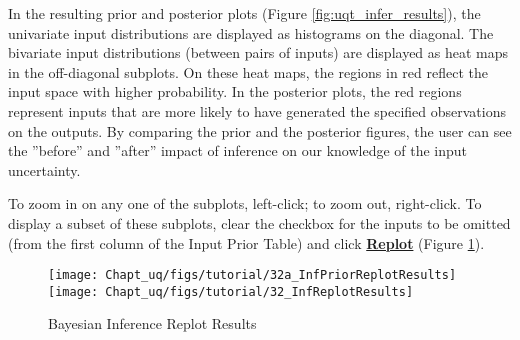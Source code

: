 In the resulting prior and posterior plots 
(Figure \ref{fig:uqt_infer_results}), the univariate
input distributions are displayed as histograms on the
diagonal. The bivariate input distributions (between pairs of inputs)
are displayed as heat maps in the off-diagonal subplots. On these heat
maps, the regions in red reflect the input space with higher probability. 
In the posterior plots, the red regions represent inputs that are more
likely to have generated the specified observations on the outputs. By
comparing the prior and the posterior figures, the user can see the ''before''
and ''after'' impact of inference on our knowledge of the input
uncertainty.

To zoom in on any one of the subplots, left-click; to zoom out, right-click.
To display a subset of these subplots, clear the checkbox for the inputs to be omitted
(from the first column of the Input Prior Table) and click \textbf{\underline{Replot}}
(Figure \ref{fig:uqt_infer_replot_results}). 

\begin{figure}[H]
\centering
\texttt{[image: Chapt\_uq/figs/tutorial/32a\_InfPriorReplotResults]}
\centering
\texttt{[image: Chapt\_uq/figs/tutorial/32\_InfReplotResults]}
\caption{Bayesian Inference Replot Results}
\label{fig:uqt_infer_replot_results}
\end{figure}
